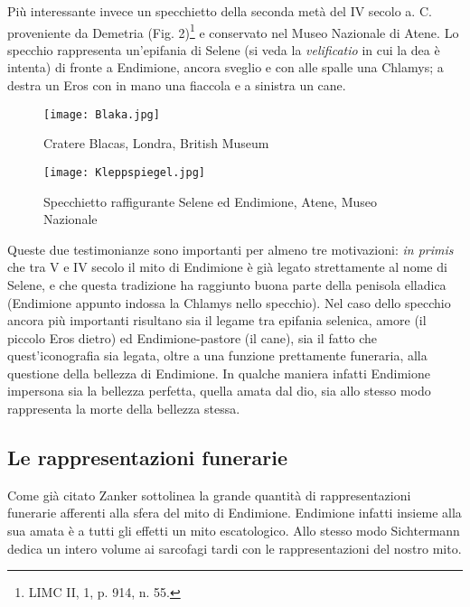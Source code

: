\documentclass[12pt,a4paper,openright, oneside]{book}
\begin{document}
 Più interessante invece un specchietto della seconda metà del IV secolo a. C. proveniente da Demetria (Fig. 2)\footnote{LIMC II, 1, p. 914, n. 55.} e conservato nel Museo Nazionale di Atene. Lo specchio rappresenta un'epifania di Selene (si veda la \textit{velificatio} in cui la dea è intenta) di fronte a Endimione, ancora sveglio e con alle spalle una Chlamys; a destra un Eros con in mano una fiaccola e a sinistra un cane.
 

  \begin{figure}\begin{center}
 \texttt{[image: Blaka.jpg]} \label{Fig. 1} \caption{Cratere Blacas, Londra, British Museum}
\texttt{[image: Kleppspiegel.jpg]} \label{Fig. 2} \caption{Specchietto raffigurante Selene ed Endimione, Atene, Museo Nazionale}
\end{center} \end{figure}


Queste due testimonianze sono importanti per almeno tre motivazioni: \textit{in primis} che tra V e IV secolo il mito di Endimione è già legato strettamente al nome di Selene, e che questa tradizione ha raggiunto buona parte della penisola elladica (Endimione appunto indossa la Chlamys nello specchio). Nel caso dello specchio ancora più importanti risultano sia il legame tra epifania selenica, amore (il piccolo Eros dietro) ed Endimione-pastore (il cane), sia il fatto che quest'iconografia sia legata, oltre a una funzione prettamente funeraria, alla questione della bellezza di Endimione. 
In qualche maniera infatti Endimione impersona sia la bellezza perfetta, quella amata dal dio, sia allo stesso modo rappresenta la morte della bellezza stessa. 

\subsection{Le rappresentazioni funerarie}

Come già citato Zanker sottolinea la grande quantità di rappresentazioni funerarie afferenti alla sfera del mito di Endimione. Endimione infatti insieme alla sua amata è a tutti gli effetti un mito escatologico. Allo stesso modo Sichtermann dedica un intero volume ai sarcofagi tardi con le rappresentazioni del nostro mito.
\end{document}
